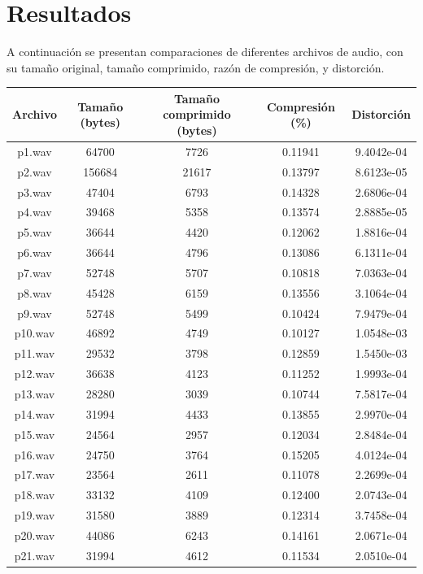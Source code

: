 \documentclass[a4paper,11pt]{article}
\begin{document}
\section{Resultados}
A continuación se presentan comparaciones de diferentes archivos de audio, con
su tamaño original, tamaño comprimido, razón de compresión, y distorción.
\begin{center}
    \begin{tabular}{c | c | c | c | c}
        \hline
        Archivo & Tamaño (bytes) & Tamaño comprimido (bytes) & Compresión (\%) &  Distorción \\ \hline
        p1.wav & 64700 & 7726 & 0.11941 & 9.4042e-04 \\
        p2.wav & 156684 & 21617 & 0.13797 & 8.6123e-05 \\
        p3.wav & 47404 & 6793 & 0.14328 & 2.6806e-04 \\
        p4.wav & 39468 & 5358 & 0.13574 & 2.8885e-05 \\
        p5.wav & 36644 & 4420 & 0.12062 & 1.8816e-04 \\
        p6.wav & 36644 & 4796 & 0.13086 & 6.1311e-04 \\
        p7.wav & 52748 & 5707 & 0.10818 & 7.0363e-04 \\
        p8.wav & 45428 & 6159 & 0.13556 & 3.1064e-04 \\
        p9.wav & 52748 & 5499 & 0.10424 & 7.9479e-04 \\
        p10.wav & 46892 & 4749 & 0.10127 & 1.0548e-03 \\
        p11.wav & 29532 & 3798 & 0.12859 & 1.5450e-03 \\
        p12.wav & 36638 & 4123 & 0.11252 & 1.9993e-04 \\
        p13.wav & 28280 & 3039 & 0.10744 & 7.5817e-04\\
        p14.wav & 31994 & 4433 & 0.13855 & 2.9970e-04\\
        p15.wav & 24564 & 2957 & 0.12034 & 2.8484e-04 \\
        p16.wav & 24750 & 3764 & 0.15205 & 4.0124e-04\\
        p17.wav & 23564 & 2611 & 0.11078 & 2.2699e-04\\
        p18.wav & 33132 & 4109 & 0.12400 & 2.0743e-04 \\
        p19.wav & 31580 & 3889 & 0.12314 & 3.7458e-04\\
        p20.wav & 44086 & 6243 & 0.14161 & 2.0671e-04\\
        p21.wav & 31994 & 4612 & 0.11534 & 2.0510e-04\\

\end{tabular}
\end{center}
\end{document}
